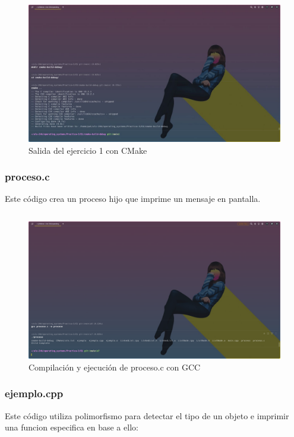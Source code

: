 \documentclass[]{article}
\newenvironment{code}{\captionsetup{type=listing}}{}
\begin{document}
\begin{figure}[h]
\caption{Salida del ejercicio 1 con CMake}
\centering
\includegraphics[scale=0.4,trim={0 0 20cm 13cm},clip]{e1-out.jpg}  
\end{figure}

\subsubsection*{proceso.c}
Este código crea un proceso hijo que imprime un mensaje en pantalla.
\begin{code}
	\inputminted{c}{../E1/proceso.c}
\end{code}

\begin{figure}[h]
	\caption{Compilación y ejecución de proceso.c con GCC}
	\centering
	\includegraphics[scale=0.3,trim={0 0 20cm 27cm},clip]{e1-proceso-out.png}  
	\end{figure}

\subsubsection*{ejemplo.cpp}
Este código utiliza polimorfismo para detectar el tipo de un objeto e imprimir
una funcion especifica en base a ello:
\begin{code}
	\inputminted{c}{../E1/ejemplo.cpp}
\end{code}
\end{document}
